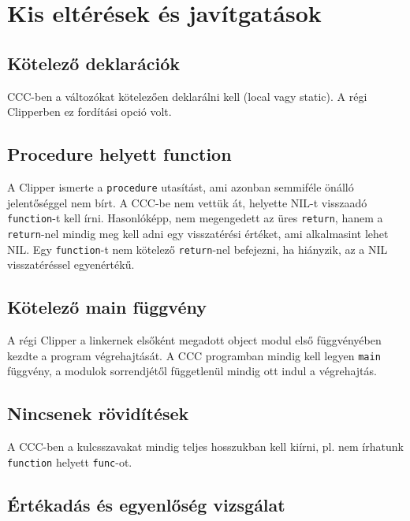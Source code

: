\section{Kis eltérések és javítgatások}


\subsection{Kötelező deklarációk}

CCC-ben a változókat kötelezően deklarálni kell (local vagy static).
A régi Clipperben ez fordítási opció volt.


\subsection{Procedure helyett function}

A Clipper ismerte a \verb!procedure! utasítást, 
ami azonban semmiféle önálló jelentőséggel nem bírt.
A CCC-be nem vettük át, helyette NIL-t visszaadó
\verb!function!-t kell írni.
Hasonlóképp, nem megengedett az üres \verb!return!, 
hanem a \verb!return!-nel mindig meg kell adni egy visszatérési 
értéket, ami alkalmasint lehet NIL. Egy \verb!function!-t nem kötelező
\verb!return!-nel befejezni, ha hiányzik, az a  NIL visszatéréssel
egyenértékű.


\subsection{Kötelező main függvény}

A régi Clipper a linkernek elsőként megadott object modul
első függvényében kezdte a program végrehajtását. A CCC
programban mindig kell legyen \verb!main! függvény, a modulok
sorrendjétől függetlenül mindig ott indul a végrehajtás.


\subsection{Nincsenek rövidítések}

A CCC-ben a kulcsszavakat mindig teljes hosszukban kell kiírni, 
pl. nem írhatunk  \verb!function! helyett \verb!func!-ot.



\subsection{Értékadás és egyenlőség vizsgálat}

